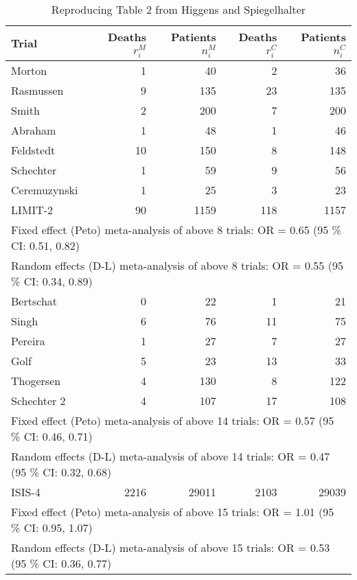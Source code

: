 \begin{table*}[htbp]
\centering
\begin{tabular}{lrrrr}
  \hline
Trial & Deaths $r_i^M$ & Patients $n_i^M$ & Deaths $r_i^C$ & Patients $n_i^C$ \\ 
  \hline
Morton &   1 &  40 &   2 &  36 \\ 
  Rasmussen &   9 & 135 &  23 & 135 \\ 
  Smith &   2 & 200 &   7 & 200 \\ 
  Abraham &   1 &  48 &   1 &  46 \\ 
  Feldstedt &  10 & 150 &   8 & 148 \\ 
  Schechter &   1 &  59 &   9 &  56 \\ 
  Ceremuzynski &   1 &  25 &   3 &  23 \\ 
  LIMIT-2 &  90 & 1159 & 118 & 1157 \\ 
   \hline
 \multicolumn{5}{l}{Fixed effect (Peto) meta-analysis of above 8 trials: OR = 0.65 (95 \% CI: 0.51, 0.82) } \\ 
 \multicolumn{5}{l}{Random effects (D-L) meta-analysis of above 8 trials: OR = 0.55 (95 \% CI: 0.34, 0.89) } \\ 
   \hline
Bertschat &   0 &  22 &   1 &  21 \\ 
  Singh &   6 &  76 &  11 &  75 \\ 
  Pereira &   1 &  27 &   7 &  27 \\ 
  Golf &   5 &  23 &  13 &  33 \\ 
  Thogersen &   4 & 130 &   8 & 122 \\ 
  Schechter 2 &   4 & 107 &  17 & 108 \\ 
   \hline
 \multicolumn{5}{l}{Fixed effect (Peto) meta-analysis of above 14 trials: OR = 0.57 (95 \% CI: 0.46, 0.71) } \\ 
 \multicolumn{5}{l}{Random effects (D-L) meta-analysis of above 14 trials: OR = 0.47 (95 \% CI: 0.32, 0.68) } \\ 
   \hline
ISIS-4 & 2216 & 29011 & 2103 & 29039 \\ 
   \hline
 \multicolumn{5}{l}{Fixed effect (Peto) meta-analysis of above 15 trials: OR = 1.01 (95 \% CI: 0.95, 1.07) } \\ 
 \multicolumn{5}{l}{Random effects (D-L) meta-analysis of above 15 trials: OR = 0.53 (95 \% CI: 0.36, 0.77) } \\ 
 \end{tabular}
\caption{Reproducing Table 2 from Higgens and Spiegelhalter}
\label{tab:Table2}
\end{table*}

